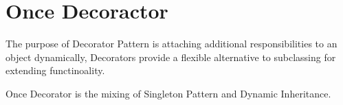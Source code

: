 \section{Once Decoractor}
The purpose of Decorator Pattern is attaching additional responsibilities to an object dynamically, Decorators provide a
flexible alternative to subclassing for extending functinoality. 

Once Decorator is the mixing of Singleton Pattern and Dynamic Inheritance.

